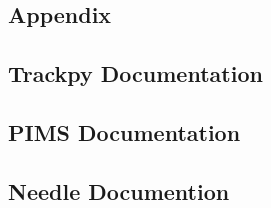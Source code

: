 \begin{appendices}
\chapter{Appendix}

\section{Trackpy Documentation}


\section{PIMS Documentation}
\section{Needle Documention}

\end{appendices}